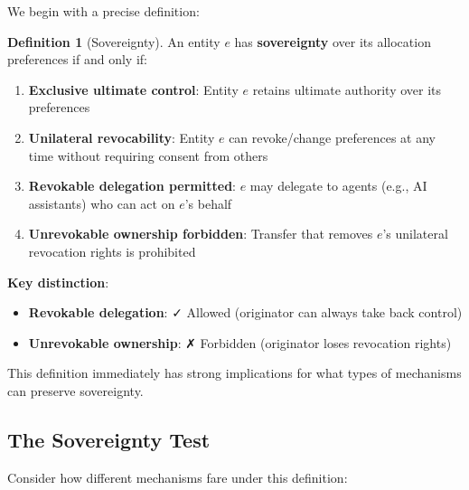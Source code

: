 \documentclass[11pt,a4paper]{article}
\theoremstyle{definition}
\newtheorem{definition}[theorem]{Definition}
\theoremstyle{remark}
\begin{document}
We begin with a precise definition:

\begin{definition}[Sovereignty]
An entity $e$ has \textbf{sovereignty} over its allocation preferences if and only if:
\begin{enumerate}
\item \textbf{Exclusive ultimate control}: Entity $e$ retains ultimate authority over its preferences
\item \textbf{Unilateral revocability}: Entity $e$ can revoke/change preferences at any time without requiring consent from others
\item \textbf{Revokable delegation permitted}: $e$ may delegate to agents (e.g., AI assistants) who can act on $e$'s behalf
\item \textbf{Unrevokable ownership forbidden}: Transfer that removes $e$'s unilateral revocation rights is prohibited
\end{enumerate}
\end{definition}

\textbf{Key distinction}:
\begin{itemize}
\item \textbf{Revokable delegation}: ✓ Allowed (originator can always take back control)
\item \textbf{Unrevokable ownership}: ✗ Forbidden (originator loses revocation rights)
\end{itemize}

This definition immediately has strong implications for what types of mechanisms can preserve sovereignty.

\subsection{The Sovereignty Test}

Consider how different mechanisms fare under this definition:
\end{document}
